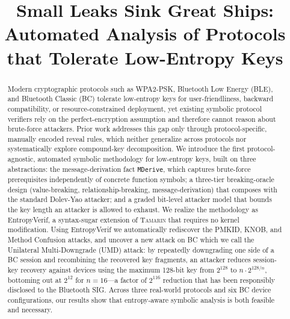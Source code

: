 \documentclass[conference]{IEEEtran}
\newcommand{\Tamarin}[0]{\textsc{Tamarin}}
\begin{document}
\title{Small Leaks Sink Great Ships:\\ Automated Analysis of Protocols that Tolerate Low-Entropy Keys}

\author{}

\maketitle

\begin{abstract}
Modern cryptographic protocols such as WPA2-PSK, Bluetooth Low Energy (BLE), and Bluetooth Classic (BC) tolerate low-entropy keys for user-friendliness, backward compatibility, or resource-constrained deployment, yet existing symbolic protocol verifiers rely on the perfect-encryption assumption and therefore cannot reason about brute-force attackers.
Prior work addresses this gap only through protocol-specific, manually encoded reveal rules, which neither generalize across protocols nor systematically explore compound-key decomposition.
We introduce the first protocol-agnostic, automated symbolic methodology for low-entropy keys,
built on three abstractions: the message-derivation fact \texttt{MDerive}, which captures
brute-force prerequisites independently of concrete function symbols; a three-tier breaking-oracle
design (value-breaking, relationship-breaking, message-derivation) that composes with the standard
Dolev-Yao attacker; and a graded bit-level attacker model that bounds the key length an attacker
is allowed to exhaust.
We realize the methodology as EntropyVerif, a syntax-sugar extension of \Tamarin{} that requires no kernel modification.
Using EntropyVerif we automatically rediscover the PMKID, KNOB, and Method Confusion attacks, and
uncover a new attack on BC which we call the Unilateral Multi-Downgrade (UMD) attack: by
repeatedly downgrading one side of a BC session and recombining the recovered key fragments, an
attacker reduces session-key recovery against devices using the maximum 128-bit key from $2^{128}$
to $n \cdot 2^{128/n}$, bottoming out at $2^{12}$ for $n=16$---a factor of $2^{116}$ reduction
that has been responsibly disclosed to the Bluetooth SIG.
Across three real-world protocols and six BC device configurations, our results show that entropy-aware symbolic analysis is both feasible and necessary.
\end{abstract}

\IEEEpeerreviewmaketitle














\appendices

\end{document}

